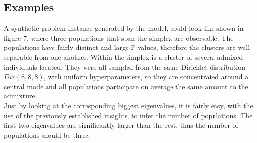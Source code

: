 \documentclass[a4paper, 11pt]{article}
\begin{document}

\subsection{Examples}
A synthetic problem instance generated by the model, could look like shown in figure 7, where three populations that span the simplex are observable. The populations have fairly distinct and large F-values, therefore the clusters are well separable from one another. Within the simplex is a cluster of several admixed individuals located. They were all sampled from the same Dirichlet distribution $Dir(8, 8, 8)$, with uniform hyperparameters, so they are concentrated around a central mode and all populations participate on average the same amount to the admixture. \\
Just by looking at the corresponding biggest eigenvalues, it is fairly easy, with the use of the previously established insights, to infer the number of populations. The first two eigenvalues are significantly larger than the rest, thus the number of populations should be three. 
\end{document}
